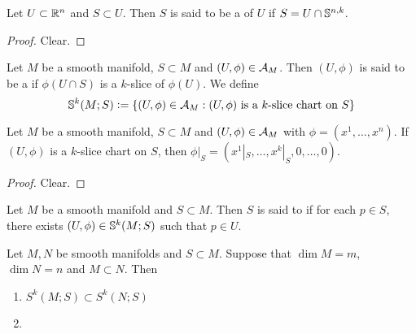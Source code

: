 \documentclass{book}
\begin{document}
	\begin{defn}  
	Let $U \subset \R^n$ and $S \subset U$. Then $S$ is said to be a  of $U$ if $S = U \cap \S^{n,k}$.
	\end{defn}		
	
	\begin{ex} 
	\end{ex}

	\begin{proof}
		Clear.
	\end{proof}
	
	\begin{defn} 
	Let $M$ be a smooth manifold, $S \subset M$ and $(U, \phi) \in \MA_M$. Then $(U, \phi)$ is said to be a  if $\phi(U \cap S)$ is a $k$-slice of $\phi(U)$. We define
	$$\S^k(M; S) \defeq \{(U, \phi) \in \MA_M: \text{$(U, \phi)$ is a $k$-slice chart on $S$}\}$$
	\end{defn}	
	
	\begin{ex} 
	Let $M$ be a smooth manifold, $S \subset M$ and $(U, \phi) \in \MA_M$ with $\phi = (x^1, \dots, x^n)$. If $(U, \phi)$ is a $k$-slice chart on $S$, then $\phi|_S = (x^1|_S, \dots, x^k|_S, 0, \dots, 0)$.
	\end{ex}
	
	\begin{proof}
	Clear. 
	\end{proof}
	
	\begin{defn} 
	Let $M$ be a smooth manifold and $S \subset M$. Then $S$ is said to  if for each $p \in S$, there exists $(U, \phi) \in \S^k(M; S)$ such that $p \in U$. 
	\end{defn}

	\begin{ex} 
		Let $M, N$ be smooth manifolds and $S \subset M$. Suppose that $\dim M = m$, $\dim N = n$ and $M \subset N$. Then  
		\begin{enumerate}
			\item $S^{k}(M;S) \subset S^k(N;S)$
			\item 
		\end{enumerate}
	\end{ex}
\end{document}
